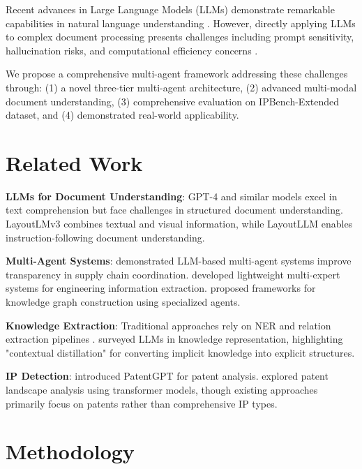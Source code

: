 \documentclass[11pt,a4paper]{article}
\begin{document}
Recent advances in Large Language Models (LLMs) demonstrate remarkable capabilities in natural language understanding \citep{openai2023gpt4, touvron2023llama}. However, directly applying LLMs to complex document processing presents challenges including prompt sensitivity, hallucination risks, and computational efficiency concerns \citep{zhang2023instruction}.

We propose a comprehensive multi-agent framework addressing these challenges through: (1) a novel three-tier multi-agent architecture, (2) advanced multi-modal document understanding, (3) comprehensive evaluation on IPBench-Extended dataset, and (4) demonstrated real-world applicability.

\section{Related Work}

\textbf{LLMs for Document Understanding}: GPT-4 \citep{openai2023gpt4} and similar models excel in text comprehension but face challenges in structured document understanding. LayoutLMv3 \citep{huang2022layoutlmv3} combines textual and visual information, while LayoutLLM \citep{huang2024layoutllm} enables instruction-following document understanding.

\textbf{Multi-Agent Systems}: \citet{zhao2025multia} demonstrated LLM-based multi-agent systems improve transparency in supply chain coordination. \citet{bogachov2025lightweight} developed lightweight multi-expert systems for engineering information extraction. \citet{zhang2024multiagent} proposed frameworks for knowledge graph construction using specialized agents.

\textbf{Knowledge Extraction}: Traditional approaches rely on NER and relation extraction pipelines \citep{li2022survey}. \citet{wang2024survey} surveyed LLMs in knowledge representation, highlighting "contextual distillation" for converting implicit knowledge into explicit structures.

\textbf{IP Detection}: \citet{bai2024patentgpt} introduced PatentGPT for patent analysis. \citet{aristodemou2024patent} explored patent landscape analysis using transformer models, though existing approaches primarily focus on patents rather than comprehensive IP types.

\section{Methodology}
\end{document}
